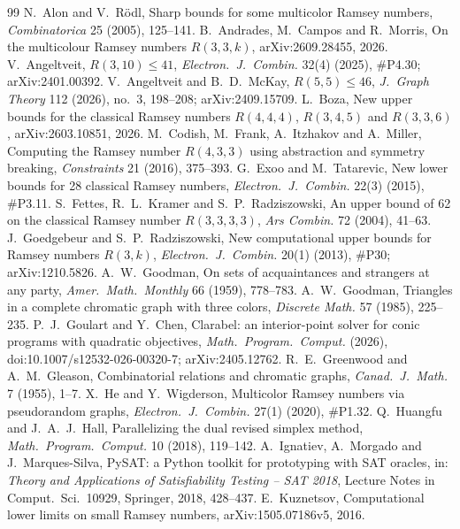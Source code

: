 \documentclass[11pt]{article}
\theoremstyle{spacedplain}
\theoremstyle{spaceddef}
\theoremstyle{spacedremark}
\begin{document}
\begin{thebibliography}{99}\small
{} N.~Alon and V.~R\"odl, Sharp bounds for some multicolor Ramsey numbers, \emph{Combinatorica} 25 (2005), 125--141.
 B.~Andrades, M.~Campos and R.~Morris, On the multicolour Ramsey numbers $R(3,3,k)$, arXiv:2609.28455, 2026.
 V.~Angeltveit, $R(3,10)\le 41$, \emph{Electron.\ J.\ Combin.} 32(4) (2025), \#P4.30; arXiv:2401.00392.
 V.~Angeltveit and B.~D.~McKay, $R(5,5)\le 46$, \emph{J.\ Graph Theory} 112 (2026), no.~3, 198--208; arXiv:2409.15709.
 L.~Boza, New upper bounds for the classical Ramsey numbers $R(4,4,4)$, $R(3,4,5)$ and $R(3,3,6)$, arXiv:2603.10851, 2026.
 M.~Codish, M.~Frank, A.~Itzhakov and A.~Miller, Computing the Ramsey number $R(4,3,3)$ using abstraction and symmetry breaking, \emph{Constraints} 21 (2016), 375--393.
 G.~Exoo and M.~Tatarevic, New lower bounds for 28 classical Ramsey numbers, \emph{Electron.\ J.\ Combin.} 22(3) (2015), \#P3.11.
 S.~Fettes, R.~L.~Kramer and S.~P.~Radziszowski, An upper bound of 62 on the classical Ramsey number $R(3,3,3,3)$, \emph{Ars Combin.} 72 (2004), 41--63.
 J.~Goedgebeur and S.~P.~Radziszowski, New computational upper bounds for Ramsey numbers $R(3,k)$, \emph{Electron.\ J.\ Combin.} 20(1) (2013), \#P30; arXiv:1210.5826.
 A.~W.~Goodman, On sets of acquaintances and strangers at any party, \emph{Amer.\ Math.\ Monthly} 66 (1959), 778--783.
 A.~W.~Goodman, Triangles in a complete chromatic graph with three colors, \emph{Discrete Math.} 57 (1985), 225--235.
 P.~J.~Goulart and Y.~Chen, Clarabel: an interior-point solver for conic programs with quadratic objectives, \emph{Math.\ Program.\ Comput.} (2026), doi:10.1007/s12532-026-00320-7; arXiv:2405.12762.
 R.~E.~Greenwood and A.~M.~Gleason, Combinatorial relations and chromatic graphs, \emph{Canad.\ J.\ Math.} 7 (1955), 1--7.
 X.~He and Y.~Wigderson, Multicolor Ramsey numbers via pseudorandom graphs, \emph{Electron.\ J.\ Combin.} 27(1) (2020), \#P1.32.
 Q.~Huangfu and J.~A.~J.~Hall, Parallelizing the dual revised simplex method, \emph{Math.\ Program.\ Comput.} 10 (2018), 119--142.
 A.~Ignatiev, A.~Morgado and J.~Marques-Silva, PySAT: a Python toolkit for prototyping with SAT oracles, in: \emph{Theory and Applications of Satisfiability Testing -- SAT 2018}, Lecture Notes in Comput.\ Sci.\ 10929, Springer, 2018, 428--437.
 E.~Kuznetsov, Computational lower limits on small Ramsey numbers, arXiv:1505.07186v5, 2016.

\end{thebibliography}
\end{document}
